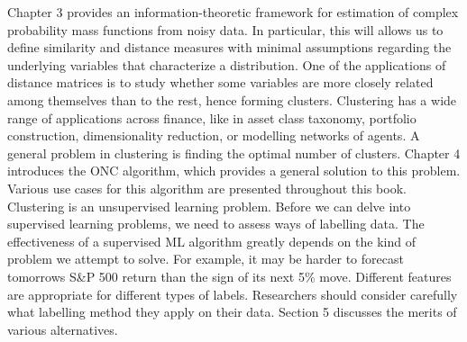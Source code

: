 \documentclass[10pt]{article}[draft]
\begin{document}
Chapter 3 provides an information-theoretic framework for estimation of complex probability mass functions from noisy data. In particular, this will allows us to define similarity and distance measures with minimal assumptions regarding the underlying variables that characterize a distribution. One of the applications of distance matrices is to study whether some variables are more closely related among themselves than to the rest, hence forming clusters. Clustering has a wide range of applications across finance, like in asset class taxonomy, portfolio construction, dimensionality reduction, or modelling networks of agents. A general problem in clustering is finding the optimal number of clusters. Chapter 4 introduces the ONC algorithm, which provides a general solution to this problem. Various use cases for this algorithm are presented throughout this book. Clustering is an unsupervised learning problem. Before we can delve into supervised learning problems, we need to assess ways of labelling  data. The effectiveness of a supervised ML algorithm greatly depends on the kind of problem we attempt to solve. For example, it may be harder to forecast tomorrows S\&P 500 return than the sign of its next 5\% move. Different features are appropriate for different types of labels. Researchers should consider carefully what labelling method they apply on their data. Section 5 discusses the merits of various alternatives.
		
\end{document}
